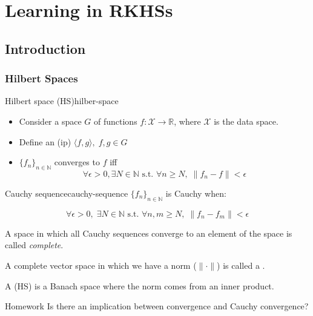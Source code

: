 \chapter[RKHSs]{Learning in RKHSs}

\section{Introduction}

\subsection{Hilbert Spaces}

\begin{definition}[parbox=false]{Hilbert space (HS)}{hilber-space}
	\begin{itemize}
		\item Consider a space $G$ of functions $f: \mathcal{X} \to \mathbb{R}$,
		      where $\mathcal{X}$ is the data space.

		\item Define an  (ip) $\langle f, g \rangle, \; f, g \in G$ %
		\item $\{f_n\}_{n \in \mathds{N}}$ converges to $f$ iff
		      $$\forall \epsilon > 0, \exists N \in \mathds{N} \text{ s.t. } \forall n \geq N, \; \lVert f_n - f \rVert < \epsilon$$
	\end{itemize}
	\begin{definition}{Cauchy sequence}{cauchy-sequence}
		$\{f_n\}_{n \in \mathds{N}}$ is Cauchy when:

		$$\forall \epsilon > 0, \; \exists N \in \mathds{N} \text{ s.t. } \forall n, m \geq N, \; \lVert f_n - f_m \rVert < \epsilon$$
	\end{definition}

	A space in which all Cauchy sequences converge to an element of the space is
	called \emph{complete}.

	A complete vector space in which we have
	a norm ($\lVert \cdot \rVert$) is called a .

	\begin{marker}
		A  (HS) is a Banach space where the norm
		comes from an inner product.
	\end{marker}

\end{definition}

\begin{question}{Homework}{}
	Is there an implication between convergence and Cauchy convergence?
\end{question}

